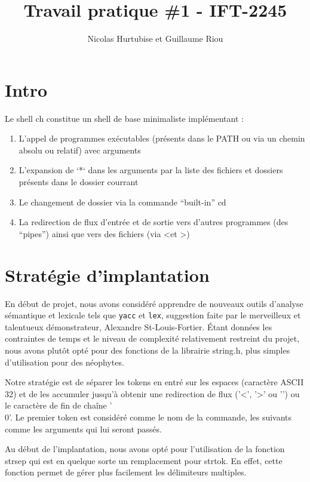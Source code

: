 \documentclass{article}
\title{Travail pratique \#1 - IFT-2245}
\author{Nicolas Hurtubise et Guillaume Riou}
\begin{document}
\maketitle

\newpage

\section{Intro}

Le shell ch constitue un shell de base minimaliste implémentant :

\begin{enumerate}
\item L'appel de programmes exécutables (présents dans le PATH ou via un chemin absolu ou relatif) avec arguments
\item L'expansion de `*` dans les arguments par la liste des fichiers et dossiers présents dans le dossier courrant
\item Le changement de dossier via la commande ``built-in'' cd
\item La redirection de flux d'entrée et de sortie vers d'autres programmes (des ``pipes'') ainsi que vers des fichiers (via \textless et \textgreater)
\end{enumerate}

\section{Stratégie d'implantation}

En début de projet, nous avons considéré apprendre de nouveaux outils d'analyse sémantique et lexicale tels que \texttt{yacc} et \texttt{lex}, suggestion faite par le merveilleux et talentueux démonstrateur, Alexandre St-Louis-Fortier. Étant données les contraintes de temps et le niveau de complexité relativement restreint du projet, nous avons plutôt opté pour des fonctions de la librairie string.h, plus simples d'utilisation pour des néophytes.


Notre stratégie est de séparer les tokens en entré sur les espaces (caractère ASCII 32) et de les accumuler jusqu'à obtenir une redirection de flux ('\textless', '\textgreater' ou '\textbar') ou le caractère de fin de chaîne '\\0'. Le premier token est considéré comme le nom de la commande, les suivants comme les arguments qui lui seront passés.

Au début de l'implantation, nous avons opté pour l'utilisation de la fonction strsep qui est en quelque sorte un remplacement pour strtok. En effet, cette fonction permet de gérer plus facilement les délimiteurs multiples.
\end{document}
